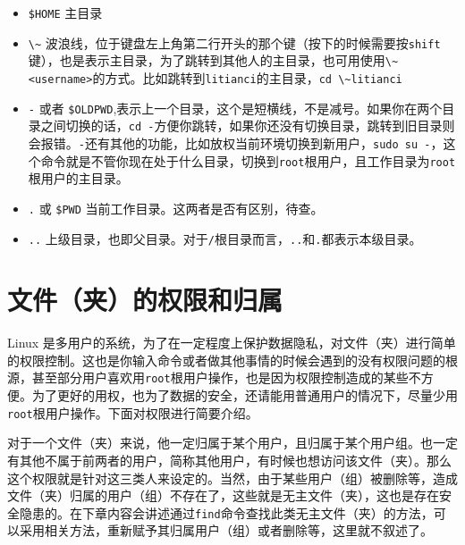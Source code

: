\documentclass[doctor,openright,twoside]{sjtuthesis}
\providecommand{\tightlist}{%
    \setlength{\itemsep}{0pt}\setlength{\parskip}{0pt}}
\newcommand{\passthrough}[1]{#1}
\theoremstyle{plain}
\theoremstyle{definition}
\theoremstyle{remark}
\theoremstyle{ocrenumbox}
\theoremstyle{plain}
\begin{document}
\begin{itemize}
\tightlist
\item
  \passthrough{\lstinline!$HOME!} 主目录
\item
  \passthrough{\lstinline!\~!} 波浪线，位于键盘左上角第二行开头的那个键（按下的时候需要按\passthrough{\lstinline!shift!}键），也是表示主目录，为了跳转到其他人的主目录，也可用使用\passthrough{\lstinline!\~<username>!}的方式。比如跳转到\passthrough{\lstinline!litianci!}的主目录，\passthrough{\lstinline!cd \~litianci!}
\item
  \passthrough{\lstinline!-!} 或者 \passthrough{\lstinline!$OLDPWD!},表示上一个目录，这个是短横线，不是减号。如果你在两个目录之间切换的话，\passthrough{\lstinline!cd -!}方便你跳转，如果你还没有切换目录，跳转到旧目录则会报错。\passthrough{\lstinline!-!}还有其他的功能，比如放权当前环境切换到新用户，\passthrough{\lstinline!sudo su -!}，这个命令就是不管你现在处于什么目录，切换到\passthrough{\lstinline!root!}根用户，且工作目录为\passthrough{\lstinline!root!}根用户的主目录。
\item
  \passthrough{\lstinline!.!} 或 \passthrough{\lstinline!$PWD!} 当前工作目录。这两者是否有区别，待查。
\item
  \passthrough{\lstinline!..!} 上级目录，也即父目录。对于\passthrough{\lstinline!/!}根目录而言，\passthrough{\lstinline!..!}和\passthrough{\lstinline!.!}都表示本级目录。
\end{itemize}

\hypertarget{section-64}{%
\section{文件（夹）的权限和归属}\label{section-64}}

Linux 是多用户的系统，为了在一定程度上保护数据隐私，对文件（夹）进行简单的权限控制。这也是你输入命令或者做其他事情的时候会遇到的没有权限问题的根源，甚至部分用户喜欢用\passthrough{\lstinline!root!}根用户操作，也是因为权限控制造成的某些不方便。为了更好的用权，也为了数据的安全，还请能用普通用户的情况下，尽量少用\passthrough{\lstinline!root!}根用户操作。下面对权限进行简要介绍。

对于一个文件（夹）来说，他一定归属于某个用户，且归属于某个用户组。也一定有其他不属于前两者的用户，简称其他用户，有时候也想访问该文件（夹）。那么这个权限就是针对这三类人来设定的。当然，由于某些用户（组）被删除等，造成文件（夹）归属的用户（组）不存在了，这些就是无主文件（夹），这也是存在安全隐患的。在下章内容会讲述通过\passthrough{\lstinline!find!}命令查找此类无主文件（夹）的方法，可以采用相关方法，重新赋予其归属用户（组）或者删除等，这里就不叙述了。
\end{document}
